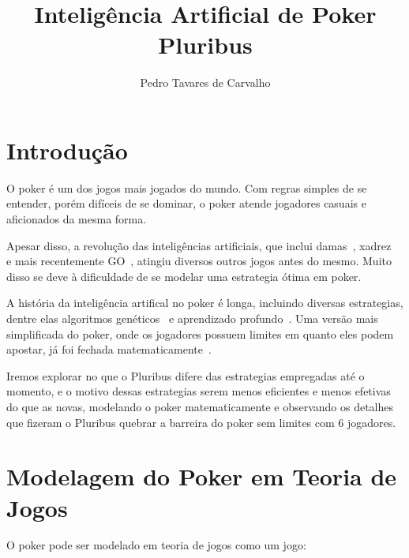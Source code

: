 \documentclass[twocolumn]{article}
\title{Inteligência Artificial de Poker\\Pluribus}
\author{Pedro Tavares de Carvalho}
\theoremstyle{mytheoremstyle}
\theoremstyle{mytheoremstyle}
\theoremstyle{myproblemstyle}
\begin{document}
        \maketitle

        \thispagestyle{empty}


    \section{Introdução} %
    \label{sec:Introdução}
        O poker é um dos jogos mais jogados do mundo. Com regras simples de se entender, porém
        difíceis de se dominar, o poker atende jogadores casuais e aficionados da mesma forma.

        Apesar disso, a revolução das inteligências artificiais, que inclui damas~\cite{5392560}, xadrez~\cite{CAMPBELL200257}
        e mais recentemente GO~\cite{Silver2016}, atingiu diversos outros jogos antes do mesmo. Muito disso se deve à
        dificuldade de se modelar uma \gls{estrategia} ótima em poker.

        A história da inteligência artifical no poker é longa, incluindo diversas \glspl{estrategia}, dentre elas algoritmos genéticos~\cite{4219032} e
        aprendizado profundo~\cite{DBLP:journals/corr/MoravcikSBLMBDW17}. Uma versão mais simplificada do poker, onde os jogadores possuem
        limites em quanto eles podem apostar, já foi fechada matematicamente~\cite{bowling2015heads}.

        Iremos explorar no que o Pluribus difere das \glspl{estrategia} empregadas até o momento, e o motivo dessas \glspl{estrategia} serem menos eficientes
        e menos efetivas do que as novas, modelando o poker matematicamente e observando os detalhes que fizeram o Pluribus quebrar a barreira
        do poker sem limites com 6 jogadores.


    \section{Modelagem do Poker em Teoria de Jogos } %
    \label{sec:Modelagem do Poker em Teoria de Jogos }
        O poker pode ser modelado em teoria de jogos como um jogo:
\end{document}
